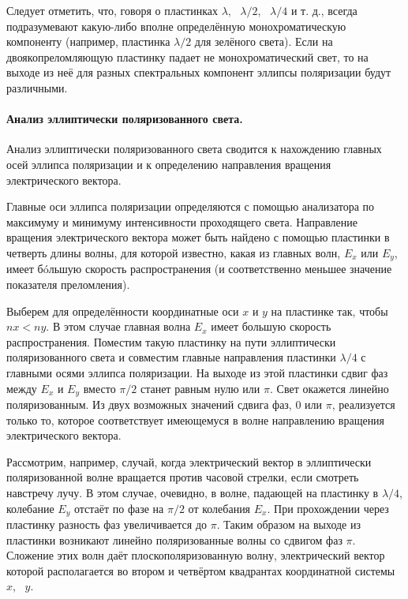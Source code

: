 \documentclass[a4paper,12pt]{article} %
\begin{document}
Следует отметить, что, говоря о пластинках $\lambda,\text{ } \lambda/2,\text{ } \lambda/4$ и т. д., всегда подразумевают какую-либо вполне определённую монохроматическую компоненту (например, пластинка $\lambda/2$ для зелёного света). Если на двоякопреломляющую пластинку падает не монохроматический свет, то на выходе из неё для разных спектральных компонент эллипсы поляризации будут различными.

\paragraph{Анализ эллиптически поляризованного света.} Анализ эллиптически поляризованного света сводится к нахождению главных осей эллипса поляризации и к определению направления вращения электрического вектора.

Главные оси эллипса поляризации определяются с помощью анализатора по максимуму и минимуму интенсивности проходящего света. Направление вращения электрического вектора может быть найдено с помощью пластинки в четверть длины волны, для которой известно, какая из главных волн, $ E_x $ или $ E_y $, имеет б\'{o}льшую скорость распространения (и соответственно меньшее значение показателя преломления).

Выберем для определённости координатные оси $x$ и $y$ на пластинке так, чтобы $nx<ny$. В этом случае главная волна $E_x$ имеет большую скорость распространения. Поместим такую пластинку на пути эллиптически поляризованного света и совместим главные направления пластинки $\lambda/4$ с главными осями эллипса поляризации. На выходе из этой пластинки сдвиг фаз между $E_x$ и $E_y$ вместо $\pi/2$ станет равным нулю или $\pi$. Свет окажется линейно поляризованным. Из двух возможных значений сдвига фаз, $0$ или $\pi$, реализуется только то, которое соответствует имеющемуся в волне направлению вращения электрического вектора.

Рассмотрим, например, случай, когда электрический вектор в эллиптически поляризованной волне вращается против часовой стрелки, если смотреть навстречу лучу. В этом случае, очевидно, в волне, падающей на пластинку в $\lambda/4$, колебание $E_y$ отстаёт по фазе на $\pi/2$ от колебания $E_x$. При прохождении через пластинку разность фаз увеличивается до $\pi$. Таким образом на выходе из пластинки возникают линейно поляризованные волны со сдвигом фаз $\pi$. Сложение этих волн даёт плоскополяризованную волну, электрический вектор которой располагается во втором и четвёртом квадрантах координатной системы $x,\text{ }y$.
\end{document}
